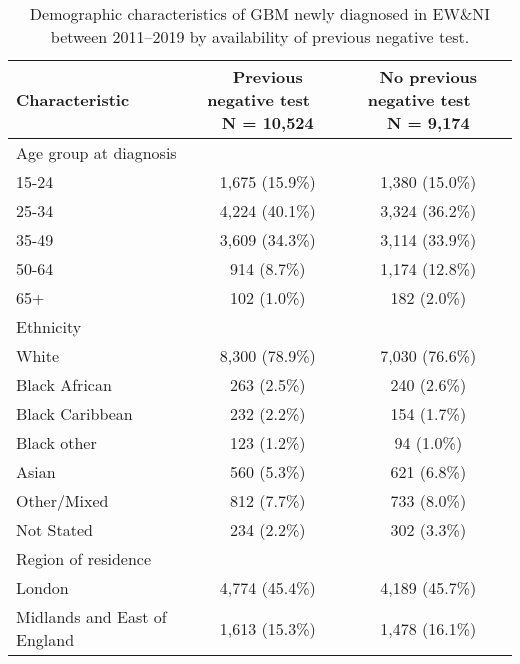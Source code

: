 \begin{table}[!h]
\centering\centering
\caption{\label{tab:lastneg_demog}Demographic characteristics of GBM newly diagnosed in EW\&NI between 2011--2019 by availability of previous negative test.}
\centering
\begin{tabular}[t]{lcc}
\toprule
\textbf{Characteristic} & \makecell[c]{\textbf{Previous negative test}\ \ \\N = 10,524} & \makecell[c]{\textbf{No previous negative test}\ \ \\N = 9,174}\\
\midrule
Age group at diagnosis &  & \\
\hspace{1em}15-24 & 1,675 (15.9\%) & 1,380 (15.0\%)\\
\hspace{1em}25-34 & 4,224 (40.1\%) & 3,324 (36.2\%)\\
\hspace{1em}35-49 & 3,609 (34.3\%) & 3,114 (33.9\%)\\
\hspace{1em}50-64 & 914 (8.7\%) & 1,174 (12.8\%)\\
\hspace{1em}65+ & 102 (1.0\%) & 182 (2.0\%)\\
Ethnicity &  & \\
\hspace{1em}White & 8,300 (78.9\%) & 7,030 (76.6\%)\\
\hspace{1em}Black African & 263 (2.5\%) & 240 (2.6\%)\\
\hspace{1em}Black Caribbean & 232 (2.2\%) & 154 (1.7\%)\\
\hspace{1em}Black other & 123 (1.2\%) & 94 (1.0\%)\\
\hspace{1em}Asian & 560 (5.3\%) & 621 (6.8\%)\\
\hspace{1em}Other/Mixed & 812 (7.7\%) & 733 (8.0\%)\\
\hspace{1em}Not Stated & 234 (2.2\%) & 302 (3.3\%)\\
Region of residence &  & \\
\hspace{1em}London & 4,774 (45.4\%) & 4,189 (45.7\%)\\
\hspace{1em}Midlands and East of England & 1,613 (15.3\%) & 1,478 (16.1\%)\\

\end{tabular}
\end{table}
